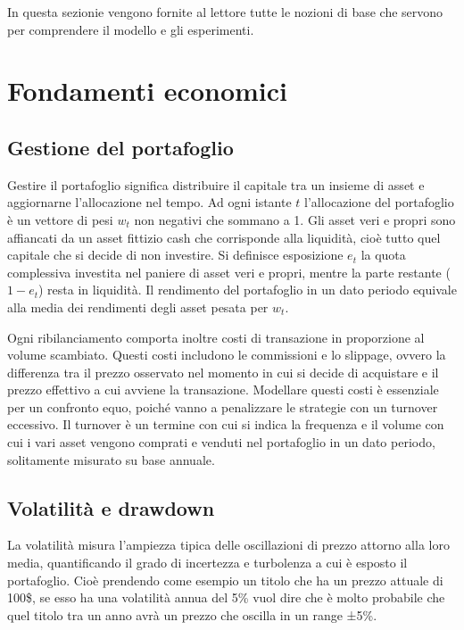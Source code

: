 

In questa sezionie vengono fornite al lettore tutte le nozioni di base che servono per comprendere il modello e gli esperimenti.

\section{Fondamenti economici}

\subsection{Gestione del portafoglio}

Gestire il portafoglio significa distribuire il capitale tra un insieme di asset e aggiornarne l'allocazione nel tempo. Ad ogni istante $t$ l'allocazione del portafoglio è un vettore di pesi $w_t$ non negativi che sommano a 1. 
Gli asset veri e propri sono affiancati da un asset fittizio cash che corrisponde alla liquidità, cioè tutto quel capitale che si decide di non investire. 
Si definisce esposizione $e_t$ la quota complessiva investita nel paniere di asset veri e propri, mentre la parte restante ($1-e_t$) resta in liquidità. 
Il rendimento del portafoglio in un dato periodo equivale alla media dei rendimenti degli asset pesata per $w_t$. 

Ogni ribilanciamento comporta inoltre costi di transazione in proporzione al volume scambiato. Questi costi includono le commissioni e lo slippage, ovvero la differenza tra il prezzo osservato nel momento in cui si decide di acquistare e il prezzo effettivo a cui avviene la transazione. 
Modellare questi costi è essenziale per un confronto equo, poiché vanno a penalizzare le strategie con un turnover eccessivo. Il turnover è un termine con cui si indica la frequenza e il volume con cui i vari asset vengono comprati e venduti nel portafoglio in un dato periodo, solitamente misurato su base annuale.

\subsection{Volatilità e drawdown}

La volatilità misura l'ampiezza tipica delle oscillazioni di prezzo attorno alla loro media, quantificando il grado di incertezza e turbolenza a cui è esposto il portafoglio.
Cioè prendendo come esempio un titolo che ha un prezzo attuale di 100\$, se esso ha una volatilità annua del 5\% vuol dire che è molto probabile che quel titolo tra un anno avrà un prezzo che oscilla in un range ±5\%.

